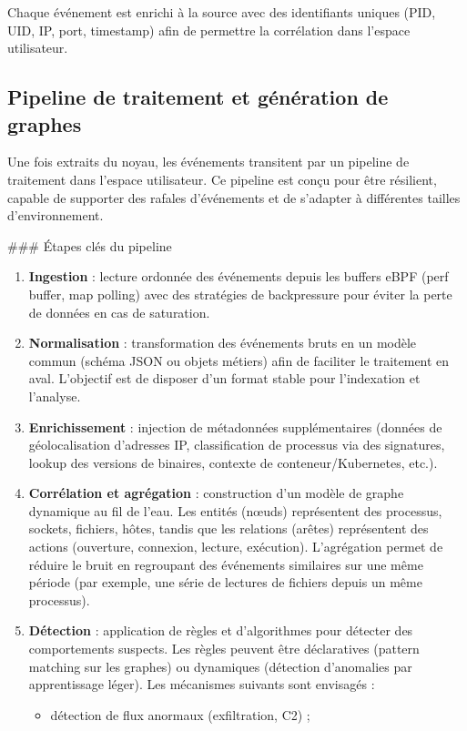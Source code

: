 \documentclass[a4paper,12pt]{article}
\begin{document}
Chaque événement est enrichi à la source avec des identifiants uniques (PID, UID, IP, port, timestamp) afin de permettre la corrélation dans l'espace utilisateur.

\subsection{Pipeline de traitement et génération de graphes}

Une fois extraits du noyau, les événements transitent par un pipeline de traitement dans l'espace utilisateur. Ce pipeline est conçu pour être résilient, capable de supporter des rafales d'événements et de s'adapter à différentes tailles d'environnement.

### Étapes clés du pipeline

\begin{enumerate}
  \item \textbf{Ingestion} : lecture ordonnée des événements depuis les buffers eBPF (perf buffer, map polling) avec des stratégies de backpressure pour éviter la perte de données en cas de saturation.
  \item \textbf{Normalisation} : transformation des événements bruts en un modèle commun (schéma JSON ou objets métiers) afin de faciliter le traitement en aval. L'objectif est de disposer d'un format stable pour l'indexation et l'analyse.
  \item \textbf{Enrichissement} : injection de métadonnées supplémentaires (données de géolocalisation d'adresses IP, classification de processus via des signatures, lookup des versions de binaires, contexte de conteneur/Kubernetes, etc.).
  \item \textbf{Corrélation et agrégation} : construction d'un modèle de graphe dynamique au fil de l'eau. Les entités (nœuds) représentent des processus, sockets, fichiers, hôtes, tandis que les relations (arêtes) représentent des actions (ouverture, connexion, lecture, exécution). L'agrégation permet de réduire le bruit en regroupant des événements similaires sur une même période (par exemple, une série de lectures de fichiers depuis un même processus).
  \item \textbf{Détection} : application de règles et d'algorithmes pour détecter des comportements suspects. Les règles peuvent être déclaratives (pattern matching sur les graphes) ou dynamiques (détection d'anomalies par apprentissage léger). Les mécanismes suivants sont envisagés :
  \begin{itemize}
    \item détection de flux anormaux (exfiltration, C2) ;

\end{itemize}
\end{enumerate}
\end{document}
